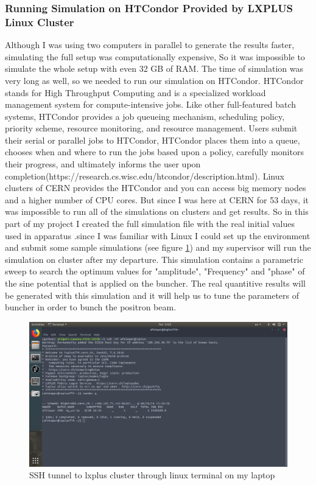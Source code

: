 \documentclass[12pt,a4paper]{article}
\begin{document}
\subsubsection{Running Simulation on HTCondor Provided by LXPLUS Linux Cluster}
Although I was using two computers in parallel to generate the results faster, simulating the full setup was computationally expensive, So it was impossible to simulate the whole setup with even 32 GB of RAM. The time of simulation was very long as well, so we needed to run our simulation on HTCondor. HTCondor stands for High Throughput Computing and is a specialized workload management system for compute-intensive jobs. Like other full-featured batch systems, HTCondor provides a job queueing mechanism, scheduling policy, priority scheme, resource monitoring, and resource management. Users submit their serial or parallel jobs to HTCondor, HTCondor places them into a queue, chooses when and where to run the jobs based upon a policy, carefully monitors their progress, and ultimately informs the user upon completion(https://research.cs.wisc.edu/htcondor/description.html). Linux clusters of CERN provides the HTCondor and you can access big memory nodes and a higher number of CPU cores. But since I was here at CERN for 53 days, it was impossible to run all of the simulations on clusters and get results. So in this part of my project I created the full simulation file with the real initial values used in apparatus .since I was familiar with Linux I could set up the environment and submit some sample simulations (see figure \ref{cluster}) and my supervisor will run the simulation on cluster after my departure. This simulation contains a parametric sweep to search the optimum values for "amplitude", "Frequency" and "phase" of the sine potential that is applied on the buncher. The real quantitive results will be generated with this simulation and it will help us to tune the parameters of buncher in order to bunch the positron beam.

\begin{figure}[h!]
\centering
\includegraphics[scale=0.26]{lxplus}
\caption{SSH tunnel to lxplus cluster through linux terminal on my laptop}
\label{cluster}
\end{figure}
\end{document}
